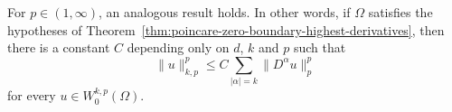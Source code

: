 \begin{Remark}
\label{rem:poincare-general-p}
For $p\in(1,\infty)$, an analogous result holds. In other words, if $\Omega$ satisfies the hypotheses of Theorem~\ref{thm:poincare-zero-boundary-highest-derivatives}, then there is a constant $C$ depending only on $d$, $k$ and $p$ such that
\begin{equation}\label{eq:poincare-zero-boundary-general-p}
\|u\|_{k,p}^p\leq C\sum_{|\alpha|=k}\|D^\alpha u\|_p^p
\end{equation}
for every $u\in W_0^{k,p}(\Omega)$.
\end{Remark}
